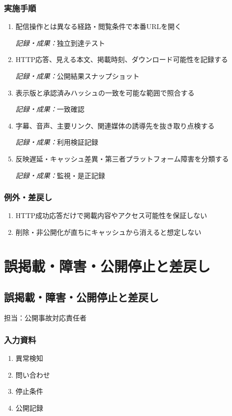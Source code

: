 \documentclass[a4paper,11pt]{article}
\begin{document}
\subsubsection*{実施手順}
\begin{enumerate}[leftmargin=2em,itemsep=0.65em]
\item 配信操作とは異なる経路・閲覧条件で本番URLを開く\par\noindent\textit{記録・成果：}独立到達テスト\nobreak\smallskip
\item HTTP応答、見える本文、掲載時刻、ダウンロード可能性を記録する\par\noindent\textit{記録・成果：}公開結果スナップショット\nobreak\smallskip
\item 表示版と承認済みハッシュの一致を可能な範囲で照合する\par\noindent\textit{記録・成果：}一致確認\nobreak\smallskip
\item 字幕、音声、主要リンク、関連媒体の誘導先を抜き取り点検する\par\noindent\textit{記録・成果：}利用検証記録\nobreak\smallskip
\item 反映遅延・キャッシュ差異・第三者プラットフォーム障害を分類する\par\noindent\textit{記録・成果：}監視・是正記録\nobreak\smallskip
\end{enumerate}
\subsubsection*{例外・差戻し}
\begin{enumerate}[leftmargin=2em,itemsep=0.35em]
\item HTTP成功応答だけで掲載内容やアクセス可能性を保証しない
\item 削除・非公開化が直ちにキャッシュから消えると想定しない
\end{enumerate}
\section{誤掲載・障害・公開停止と差戻し}
\subsection{誤掲載・障害・公開停止と差戻し}
\par 担当：公開事故対応責任者\par\medskip
\subsubsection*{入力資料}
\begin{enumerate}[leftmargin=2em,itemsep=0.35em]
\item 異常検知
\item 問い合わせ
\item 停止条件
\item 公開記録
\end{enumerate}
\end{document}

